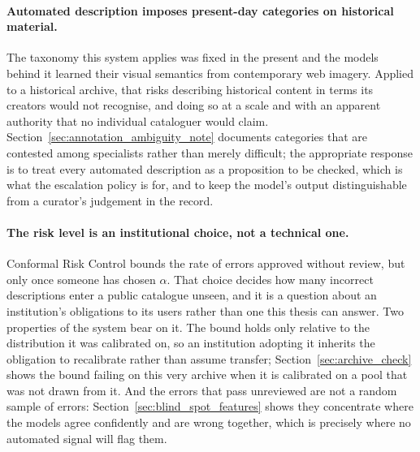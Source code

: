 \documentclass[12pt,a4paper]{report}
\begin{document}
\paragraph{Automated description imposes present-day categories on historical material.} The taxonomy this system applies was fixed in the present and the models behind it learned their visual semantics from contemporary web imagery. Applied to a historical archive, that risks describing historical content in terms its creators would not recognise, and doing so at a scale and with an apparent authority that no individual cataloguer would claim. Section~\ref{sec:annotation_ambiguity_note} documents categories that are contested among specialists rather than merely difficult; the appropriate response is to treat every automated description as a proposition to be checked, which is what the escalation policy is for, and to keep the model's output distinguishable from a curator's judgement in the record.

\paragraph{The risk level is an institutional choice, not a technical one.} Conformal Risk Control bounds the rate of errors approved without review, but only once someone has chosen $\alpha$. That choice decides how many incorrect descriptions enter a public catalogue unseen, and it is a question about an institution's obligations to its users rather than one this thesis can answer. Two properties of the system bear on it. The bound holds only relative to the distribution it was calibrated on, so an institution adopting it inherits the obligation to recalibrate rather than assume transfer; Section~\ref{sec:archive_check} shows the bound failing on this very archive when it is calibrated on a pool that was not drawn from it. And the errors that pass unreviewed are not a random sample of errors: Section~\ref{sec:blind_spot_features} shows they concentrate where the models agree confidently and are wrong together, which is precisely where no automated signal will flag them.
\end{document}
